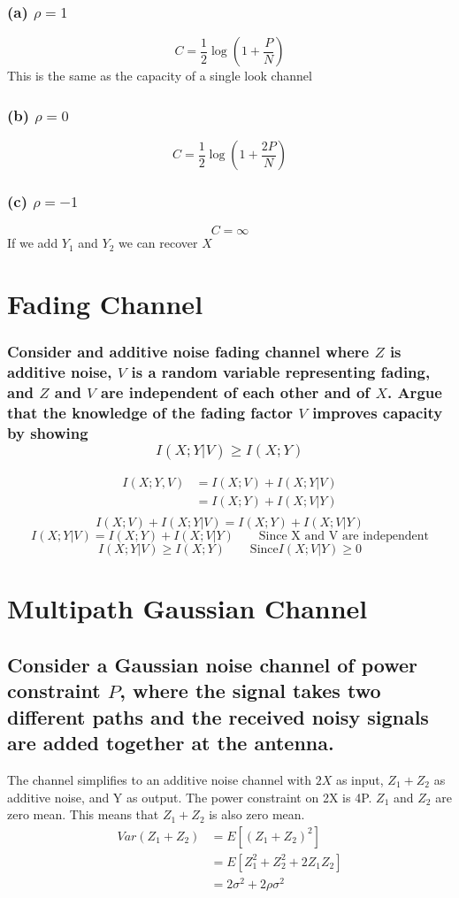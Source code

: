 \documentclass[11pt, oneside]{book}   	%
\begin{document}
\subsubsection{(a) $\rho = 1$}
$$C=\frac{1}{2}\log{(1+\frac{P}{N})}$$
This is the same as the capacity of a single look channel
\subsubsection{(b) $\rho = 0$}
$$C=\frac{1}{2}\log{(1+\frac{2P}{N})}$$
\subsubsection{(c) $\rho = -1$}
$$C=\infty$$
If we add $Y_1$ and $Y_2$ we can recover $X$

\section{Fading Channel}
\subsubsection{Consider and additive noise fading channel where $Z$ is additive noise, $V$ is a random variable representing fading, and $Z$ and $V$ are independent of each other and of $X$.  Argue that the knowledge of the fading factor $V$ improves capacity by showing $$I(X;Y|V) \geq I(X;Y)$$}

\begin{equation}
\begin{split}
	I(X;Y,V) & = I(X;V) + I(X;Y|V)\\
	& = I(X;Y) + I(X;V|Y)\\
\end{split}
\end{equation}
$$I(X;V)+I(X;Y|V) = I(X;Y) + I(X;V|Y)$$
$$I(X;Y|V) = I(X;Y) + I(X;V|Y) \qquad \text{Since X and V are independent} $$
$$I(X;Y|V) \geq I(X;Y) \qquad \text{Since} I(X;V|Y) \geq 0$$

\section{Multipath Gaussian Channel}
\subsection*{Consider a Gaussian noise channel of power constraint $P$, where the signal takes two different paths and the received noisy signals are added together at the antenna.}
The channel simplifies to an additive noise channel with $2X$ as input, $Z_1+Z_2$ as additive noise, and Y as output.  The power constraint on 2X is 4P.  $Z_1$ and $Z_2$ are zero mean.  This means that $Z_1+Z_2$ is also zero mean.
\begin{equation}
\begin{split}
Var(Z_1+Z_2) & = E[(Z_1+Z_2)^2]\\
& = E[Z_1^2 + Z_2^2 + 2Z_1Z_2]\\
& = 2\sigma^2+2\rho\sigma^2\\
\end{split}
\end{equation} 
\end{document}
